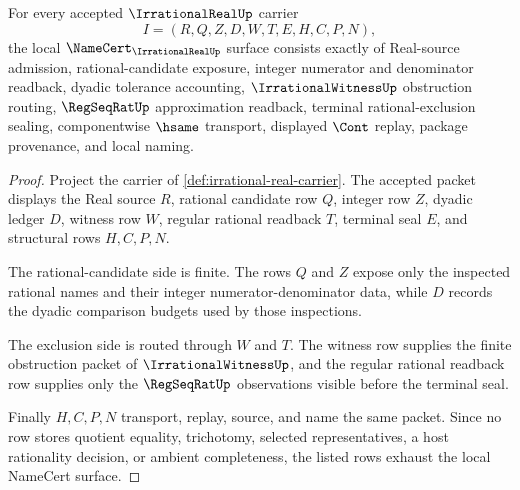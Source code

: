 \begin{theorem}
\label{thm:irrational-real-namecert-obligations}
For every accepted $\IrrationalRealUp$ carrier
$$
I=(R,Q,Z,D,W,T,E,H,C,P,N),
$$
the local $\NameCert_{\IrrationalRealUp}$ surface consists exactly of Real-source admission, rational-candidate exposure, integer numerator and denominator readback, dyadic tolerance accounting, $\IrrationalWitnessUp$ obstruction routing, $\RegSeqRatUp$ approximation readback, terminal rational-exclusion sealing, componentwise $\hsame$ transport, displayed $\Cont$ replay, package provenance, and local naming.
\end{theorem}
\begin{proof}
Project the carrier of \autoref{def:irrational-real-carrier}. The accepted packet displays the Real source $R$, rational candidate row $Q$, integer row $Z$, dyadic ledger $D$, witness row $W$, regular rational readback $T$, terminal seal $E$, and structural rows $H,C,P,N$.

The rational-candidate side is finite. The rows $Q$ and $Z$ expose only the inspected rational names and their integer numerator-denominator data, while $D$ records the dyadic comparison budgets used by those inspections.

The exclusion side is routed through $W$ and $T$. The witness row supplies the finite obstruction packet of $\IrrationalWitnessUp$, and the regular rational readback row supplies only the $\RegSeqRatUp$ observations visible before the terminal seal.

Finally $H,C,P,N$ transport, replay, source, and name the same packet. Since no row stores quotient equality, trichotomy, selected representatives, a host rationality decision, or ambient completeness, the listed rows exhaust the local NameCert surface.
\end{proof}

